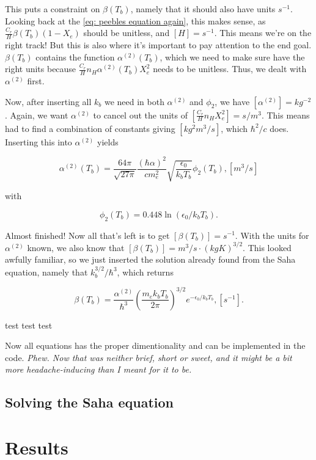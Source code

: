 \documentclass[12pt]{article}
\begin{document}
This puts a constraint on $\beta(T_b)$, namely that it should also have units $s^{-1}$. Looking back at the \cref{eq: peebles equation again}, this makes sense, as $\frac{C_r}{H}\beta(T_b)(1-X_e)$ should be unitless, and $[H] = s^{-1}$. This means we're on the right track! But this is also where it's important to pay attention to the end goal. $\beta(T_b)$ contains the function $\alpha^{(2)}(T_b)$, which we need to make sure have the right units because $\frac{C_r}{H}n_H\alpha^{(2)}(T_b)X_e^2$ needs to be unitless. Thus, we dealt with $\alpha^{(2)}$ first. 

Now, after inserting all $k_b$ we need in both $\alpha^{(2)}$ and $\phi_2$, we have $[\alpha^{(2)}] = kg^{-2}$. Again, we want $\alpha^{(2)}$ to cancel out the units of $[\frac{C_r}{H}n_HX_e^2] = s/m^3$. This means had to find a combination of constants giving $[kg^2m^3/s]$, which $\hbar^2/c$ does. Inserting this into $\alpha^{(2)}$ yields

\begin{equation*}
    \alpha^{(2)}(T_b)  =\frac{64 \pi}{\sqrt{27 \pi}} \frac{(\hbar\alpha)^{2}}{cm_{e}^{2}} \sqrt{\frac{\epsilon_{0}}{k_bT_{b}}} \phi_{2}\left(T_{b}\right), [m^3/s]
\end{equation*}

with

\begin{equation*}
    \phi_2(T_b) = 0.448\ln(\epsilon_0/k_b T_b).
\end{equation*}


Almost finished! Now all that's left is to get $[\beta(T_b)] = s^{-1}$. With the units for $\alpha^{(2)}$ known, we also know that $[\beta(T_b)] = m^3/s\cdot\left(kgK\right)^{3/2}$. This looked awfully familiar, so we just inserted the solution already found from the Saha equation, namely that $k_b^{3/2}/\hbar^3$, which returns

\begin{equation*}
    \beta(T_b) = \frac{\alpha^{(2)}}{\hbar^3} \left(\frac{m_e k_b T_b}{2\pi}\right)^{3/2} e^{-\epsilon_0/k_b T_b}, [s^{-1}].
\end{equation*}

test test test

Now all equations has the proper dimentionality and can be implemented in the code. \textit{Phew. Now that was neither brief, short or sweet, and it might be a bit more headache-inducing than I meant for it to be.}

\subsection{Solving the Saha equation}
\section{Results}

{}

\end{document}
